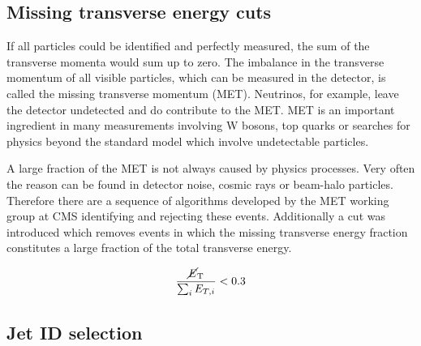 
\subsection{Missing transverse energy cuts}

If all particles could be identified and perfectly measured, the sum of the
transverse momenta would sum up to zero. The imbalance in the transverse
momentum of all visible particles, which can be measured in the detector, is
called the missing transverse momentum (MET). Neutrinos, for example, leave the
detector undetected and do contribute to the MET. MET is an important ingredient
in many measurements involving W bosons, top quarks or searches for physics
beyond the standard model which involve undetectable particles. 

A large fraction of the MET is not always caused by physics processes. Very
often the reason can be found in detector noise, cosmic rays or beam-halo
particles. Therefore there are a sequence of algorithms developed by the MET
working group at CMS identifying and rejecting these events. Additionally a cut
was introduced which removes events in which the missing transverse energy
fraction \met constitutes a large fraction of the total transverse energy.

\begin{equation}
    \frac{\cancel{E}_{\mathrm{T}}}{\sum_i E_{T,i}} < 0.3
\end{equation}

\subsection{Jet ID selection}

